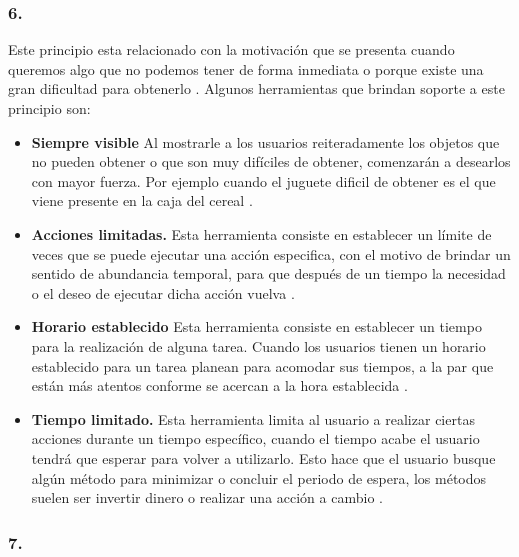 \subsubsection{6. \principioVI} \label{subsec:principioVI}

 Este principio esta relacionado con la motivación que se presenta cuando queremos algo
 que no podemos tener de forma inmediata  o porque existe una gran dificultad para obtenerlo
 \cite[p. 233]{Octalysis}. Algunos herramientas que brindan soporte a este principio son:

    \begin{itemize}
    \item
    {\bf Siempre visible} %
        Al mostrarle a los usuarios reiteradamente los objetos que no pueden obtener o que
        son muy difíciles de obtener, comenzarán a desearlos con mayor fuerza. Por ejemplo
        cuando el juguete dificil de obtener es el que viene presente en la caja del cereal
        \cite[p. 252]{Octalysis}.

    \item
    {\bf Acciones limitadas.} %
        Esta herramienta consiste en establecer un límite de veces que se puede ejecutar una
        acción especifica, con el motivo de brindar un sentido de abundancia temporal, para
        que después de un tiempo la necesidad o el deseo de ejecutar dicha acción vuelva
        \cite[p. 256]{Octalysis}.

    \item
    {\bf Horario establecido} %
        Esta herramienta consiste en establecer un tiempo para la realización de alguna tarea.
        Cuando los usuarios tienen un horario establecido para un tarea planean para acomodar
        sus tiempos, a la par que están más atentos conforme se acercan a la hora establecida
        \cite[p. 258]{Octalysis}.

    \item
    {\bf Tiempo limitado.} %
        Esta herramienta limita al usuario a realizar ciertas acciones durante un tiempo
        específico, cuando el tiempo acabe el usuario tendrá que esperar para volver a
        utilizarlo. Esto hace que el usuario busque algún método para minimizar o concluir
        el periodo de espera, los métodos suelen ser invertir dinero o realizar una acción
        a cambio \cite[p. 261]{Octalysis}.
    \end{itemize}

\subsubsection{7. \principioVII}
\label{subsec:principioVII}

